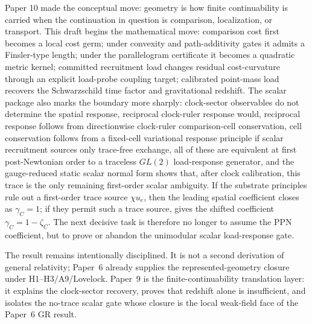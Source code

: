 \documentclass[11pt]{article}
\theoremstyle{remark}
\begin{document}
Paper 10 made the conceptual move: geometry is how finite continuability is carried when the continuation in question is comparison, localization, or transport.  This draft begins the mathematical move: comparison cost first becomes a local cost germ; under convexity and path-additivity gates it admits a Finsler-type length; under the parallelogram certificate it becomes a quadratic metric kernel; committed recruitment load changes residual cost-curvature through an explicit load-probe coupling target; calibrated point-mass load recovers the Schwarzschild time factor and gravitational redshift.  The scalar package also marks the boundary more sharply: clock-sector observables do not determine the spatial response, reciprocal clock-ruler response would, reciprocal response follows from directionwise clock-ruler comparison-cell conservation, cell conservation follows from a fixed-cell variational response principle if scalar recruitment sources only trace-free exchange, all of these are equivalent at first post-Newtonian order to a traceless \(GL(2)\) load-response generator, and the gauge-reduced static scalar normal form shows that, after clock calibration, this trace is the only remaining first-order scalar ambiguity.  If the substrate principles rule out a first-order trace source \(\chi u_e\), then the leading spatial coefficient closes as \(\gamma_C=1\); if they permit such a trace source,  gives the shifted coefficient \(\gamma_C=1-\zeta_C\).  The next decisive task is therefore no longer to assume the PPN coefficient, but to prove or abandon the unimodular scalar load-response gate.

The result remains intentionally disciplined.  It is not a second derivation of general relativity; Paper~6 already supplies the represented-geometry closure under H1--H3/A9/Lovelock.  Paper~9 is the finite-continuability translation layer: it explains the clock-sector recovery, proves that redshift alone is insufficient, and isolates the no-trace scalar gate whose closure is the local weak-field face of the Paper~6 GR result.

\begin{center}
\end{center}
\end{document}
